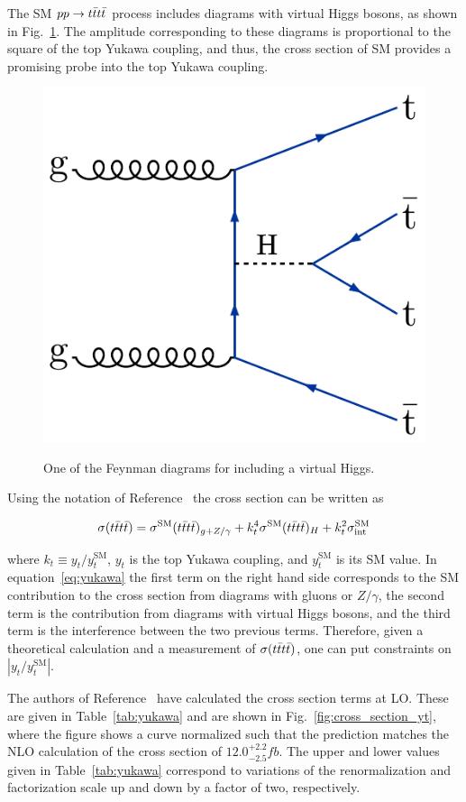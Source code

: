 The SM $pp \rightarrow t\bar{t}t\bar{t}$ process includes diagrams with virtual Higgs bosons,
as shown in Fig.~\ref{fig:feynYukawa}. 
The amplitude corresponding to these diagrams is 
proportional to the square of the top Yukawa coupling,
and thus, the cross section of SM \tttt provides
a promising probe into the top Yukawa coupling.

\begin{figure}[!hbtp]
\centering
\includegraphics[width=.35\textwidth]{figs/ftp/ftdiag3.pdf} \\
\caption{One of the Feynman diagrams for \tttt including a virtual Higgs.}
\label{fig:feynYukawa}
\end{figure}

Using the notation of Reference~\cite{THEORY:TopYukawaTTTT} the \tttt cross section can be written 
as 

\begin{equation} 
\label{eq:yukawa}
\sigma(t\bar{t}t\bar{t}) = \sigma^{\text{SM}}(t\bar{t}t\bar{t})_{g+Z/\gamma} + k_t^4 \sigma^{\text{SM}}(t\bar{t}t\bar{t})_H + k_t^2 \sigma^{\text{SM}}_{\rm int}
\end{equation} 

\noindent where $k_t \equiv y_t/y_t^{\text{SM}}$, $y_t$ is the top Yukawa coupling, and $y_t^{\text{SM}}$ is its SM value.
In equation~\ref{eq:yukawa} the first term on the right hand side corresponds to the 
SM contribution to the cross section from diagrams with gluons or $Z/\gamma$, the second term
is the contribution from diagrams with virtual Higgs bosons, and the third term is the interference between
the two previous terms. Therefore, given a theoretical calculation and a measurement of $\sigma(t\bar{t}t\bar{t})$, one can put 
constraints on $|y_t/y_t^{\text{SM}}|$.

The authors of Reference~\cite{THEORY:TopYukawaTTTT} have calculated the cross section terms at LO.
These are given in Table~\ref{tab:yukawa} and are shown in Fig.~\ref{fig:cross_section_yt},
where the figure shows a curve normalized such that the prediction matches the NLO calculation of 
the \tttt cross section of $12.0^{+2.2}_{-2.5}\unit{fb}$.
The upper and lower values given in Table~\ref{tab:yukawa} correspond to variations
of the renormalization and factorization scale up and down by a factor of two, respectively.

